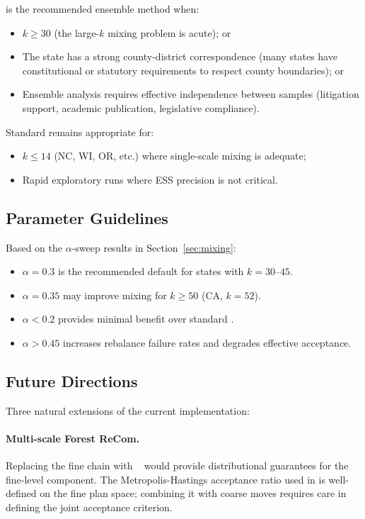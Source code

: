 \ms{} is the recommended ensemble method when:
\begin{itemize}
  \item $k \geq 30$ (the large-$k$ mixing problem is acute); or
  \item The state has a strong county-district correspondence (many states
        have constitutional or statutory requirements to respect county
        boundaries); or
  \item Ensemble analysis requires effective independence between samples
        (litigation support, academic publication, legislative compliance).
\end{itemize}

Standard \recom{} remains appropriate for:
\begin{itemize}
  \item $k \leq 14$ (NC, WI, OR, etc.) where single-scale mixing is adequate;
  \item Rapid exploratory runs where ESS precision is not critical.
\end{itemize}

\subsection{Parameter Guidelines}

Based on the $\alpha$-sweep results in Section~\ref{sec:mixing}:
\begin{itemize}
  \item $\alpha = 0.3$ is the recommended default for states with $k = 30$--$45$.
  \item $\alpha = 0.35$ may improve mixing for $k \geq 50$ (CA, $k = 52$).
  \item $\alpha < 0.2$ provides minimal benefit over standard \recom{}.
  \item $\alpha > 0.45$ increases rebalance failure rates and degrades
        effective acceptance.
\end{itemize}

\subsection{Future Directions}

Three natural extensions of the current implementation:

\paragraph{Multi-scale Forest ReCom.}
Replacing the fine \recom{} chain with \fr{}~\citep{dellaLibera2026forestRecom}
would provide distributional guarantees for the fine-level component.
The Metropolis-Hastings acceptance ratio used in \fr{} is well-defined on
the fine plan space; combining it with coarse moves requires care in
defining the joint acceptance criterion.

